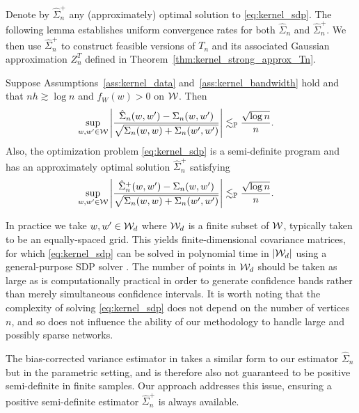 Denote by $\hat\Sigma_n^+$ any (approximately) optimal solution to
\eqref{eq:kernel_sdp}. The following lemma establishes uniform convergence rates
for both $\hat \Sigma_n$ and $\hat \Sigma_n^+$.
We then use $\hat \Sigma_n^+$ to construct feasible versions of $T_n$ and its
associated Gaussian approximation $Z_n^{T}$ defined in
Theorem~\ref{thm:kernel_strong_approx_Tn}.
%
\begin{lemma}
  \label{lem:kernel_sdp}
  Suppose Assumptions~\ref{ass:kernel_data} and~\ref{ass:kernel_bandwidth} hold
  and that $n h \gtrsim \log n$ and $f_W(w) > 0$ on $\mathcal{W}$. Then
  \begin{align*}
    \sup_{w,w' \in \mathcal{W}}
    \left| \frac{\hat \Sigma_n(w,w') - \Sigma_n(w,w')}
    {\sqrt{\Sigma_n(w,w) + \Sigma_n(w',w')}} \right|
    &\lesssim_{\mathbb{P}} \frac{\sqrt{\log n}}{n}.
  \end{align*}
  Also, the optimization problem \eqref{eq:kernel_sdp} is a semi-definite
  program
  \citep[SDP,][]{laurent2005semidefinite} and has an approximately optimal
  solution $\hat\Sigma_n^+$ satisfying
  \begin{align*}
    \sup_{w,w' \in \mathcal{W}} \left|
    \frac{\hat \Sigma_n^+(w,w') - \Sigma_n(w,w')}
    {\sqrt{\Sigma_n(w,w) + \Sigma_n(w',w')}} \right|
    &\lesssim_{\mathbb{P}} \frac{\sqrt{\log n}}{n}.
  \end{align*}
\end{lemma}

In practice we take $w, w' \in \mathcal{W}_d$ where $\mathcal{W}_d$ is a finite subset of
$\mathcal{W}$, typically taken to be an equally-spaced grid. This yields
finite-dimensional covariance matrices, for which \eqref{eq:kernel_sdp} can be
solved
in polynomial time in $|\mathcal{W}_d|$ using a general-purpose SDP solver
\citep[e.g.\ by interior point methods,][]{laurent2005semidefinite}.
The number of points in $\mathcal{W}_d$ should be taken as large as is computationally
practical in order to generate confidence bands rather than merely simultaneous
confidence intervals. It is worth noting that the complexity of solving
\eqref{eq:kernel_sdp} does not depend on the number of vertices $n$, and so
does not
influence the ability of our methodology to handle large and possibly sparse
networks.

The bias-corrected variance estimator in
\citet[Section~3.2]{matsushita2021jackknife} takes a similar form to our
estimator
$\hat\Sigma_n$ but in the parametric setting, and is therefore also not
guaranteed to be positive semi-definite in finite samples. Our approach
addresses this issue, ensuring a positive semi-definite estimator
$\hat\Sigma_n^+$ is always available.

